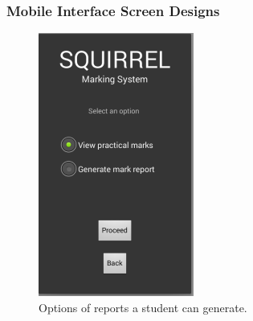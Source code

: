 \documentclass[11pt,a4paper]{article}
\begin{document}
\subsubsection{Mobile Interface Screen Designs}

	\begin{figure}[h]
	\centering
	\includegraphics[width=0.7\linewidth]{./mobile_studentViewOption}
	\caption{Options of reports a student can generate.}
	\label{fig:mobile_studentViewOption}
	\end{figure}
\pagebreak
\end{document}
